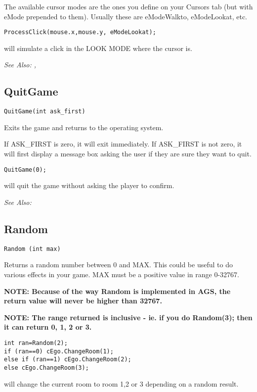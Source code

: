 The available cursor modes are the ones you define on your Cursors tab (but with eMode
prepended to them). Usually these are eModeWalkto, eModeLookat, etc.

\begin{verbatim}
ProcessClick(mouse.x,mouse.y, eModeLookat);
\end{verbatim}
will simulate a click in the LOOK MODE where the cursor is.

\it{See Also:} ,


\subsection{QuitGame}\label{QuitGame}%

\begin{verbatim}
QuitGame(int ask_first)
\end{verbatim}
Exits the game and returns to the operating system.

If ASK_FIRST is zero, it will exit immediately. If ASK_FIRST is not zero,
it will first display a message box asking the user if they are sure they
want to quit.

\begin{verbatim}
QuitGame(0);
\end{verbatim}
will quit the game without asking the player to confirm.

\it{See Also:} 


\subsection{Random}\label{Random}%

\begin{verbatim}
Random (int max)
\end{verbatim}
Returns a random number between 0 and MAX. This could be useful to do
various effects in your game. MAX must be a positive value in range 0-32767.

\bf{NOTE:} Because of the way Random is implemented in AGS, the return value will never be higher than 32767.

\bf{NOTE:} The range returned is inclusive - ie. if you do  Random(3);  then it
can return 0, 1, 2 or 3.

\begin{verbatim}
int ran=Random(2);
if (ran==0) cEgo.ChangeRoom(1);
else if (ran==1) cEgo.ChangeRoom(2);
else cEgo.ChangeRoom(3);
\end{verbatim}
will change the current room to room 1,2 or 3 depending on a random result.


